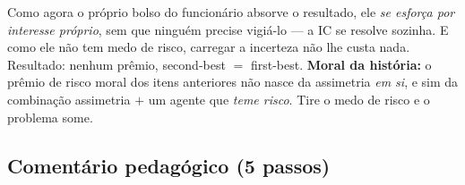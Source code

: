 \documentclass[11pt,a4paper]{article}
\begin{document}
\begin{enumerate}[leftmargin=2em,itemsep=4pt]
\begin{empalavras}
\smallskip\noindent
Como agora o próprio bolso do funcionário absorve o resultado, ele \emph{se esforça por
interesse próprio}, sem que ninguém precise vigiá-lo — a IC se resolve sozinha. E como ele
não tem medo de risco, carregar a incerteza não lhe custa nada. Resultado: nenhum prêmio,
second-best $=$ first-best. \textbf{Moral da história:} o prêmio de risco moral dos itens
anteriores não nasce da assimetria \emph{em si}, e sim da combinação assimetria $+$ um
agente que \emph{teme risco}. Tire o medo de risco e o problema some.
\end{empalavras}

\end{enumerate}

\subsection*{Comentário pedagógico (5 passos)}
\end{document}
